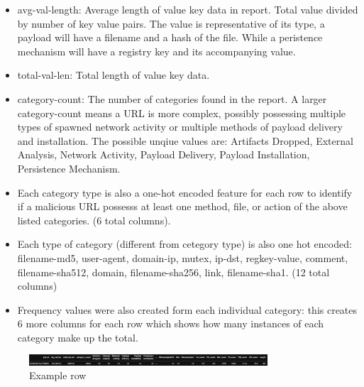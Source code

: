 \documentclass[conference]{IEEEtran}
\begin{document}
\begin{itemize}
	\item avg-val-length: Average length of value key data in report. Total value divided by number of key value pairs. The value is representative of its type, a payload will have a filename and a hash of the file. While a peristence mechanism will have a registry key and its accompanying value.\\

	\item total-val-len: Total length of value key data.\\

	\item category-count: The number of categories found in the report. A larger category-count means a URL is more complex, possibly possessing multiple types of spawned network activity or multiple methods of payload delivery and installation. The possible unqiue values are: Artifacts Dropped, External Analysis, Network Activity, Payload Delivery, Payload Installation, Persistence Mechanism.\\

	\item Each category type is also a one-hot encoded feature for each row to identify if a malicious URL possesss at least one method, file, or action of the above listed categories. (6 total columns).\\

	\item Each type of category (different from cetegory type) is also one hot encoded: filename-md5, user-agent, domain-ip, mutex, ip-dst, regkey-value, comment, filename-sha512, domain, filename-sha256, link, filename-sha1. (12 total columns)\\

	\item Frequency values were also created form each individual category: this creates 6 more columns for each row which shows how many instances of each category make up the total.\\
\end{itemize}

\begin{figure}[h]
\centerline{\includegraphics[width=3.5in, height=.2in]{example row.PNG}}
\caption{Example row}
\label{fig}
\end{figure}
\end{document}
